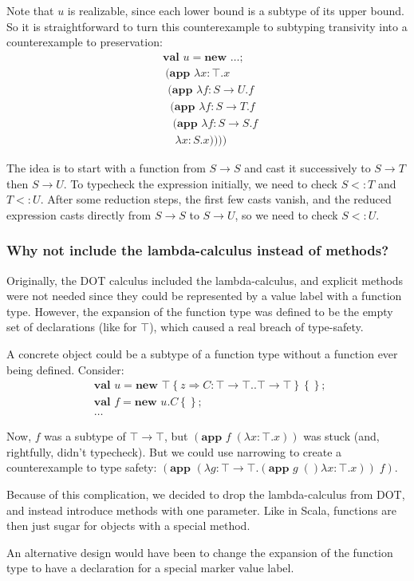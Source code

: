 \documentclass[9pt]{sigplanconf}
\newcommand{\sub}{<:}
\newcommand{\tfun}{\rightarrow}
\newcommand{\refine}[2]{\left\{#1 \Rightarrow #2 \right\}}
\newcommand{\ldefs}[1]{\left\{#1\right\}}
\newcommand{\abs}[3]{\lambda #1\!:\!#2.#3}
\newcommand{\mlnew}[3]{\textbf{val }#1 = \textbf{new }#2 ;\;\\&#3}
\newcommand{\Ldecl}[3]{#1 : #2..#3}%
\newcommand{\Top}{\top}%
\newcommand{\app}[2]{(\textbf{app }#1\;#2)}
\newcommand{\mlapp}[2]{(\textbf{app }#1\;\\&#2)}
\begin{document}
Note that $u$ is realizable, since each lower bound is a subtype of
its upper bound. So it is straightforward to turn this counterexample
to subtyping transivity into a counterexample to preservation:
\begin{align*}
&\mlnew u \ldots {
\ \mlapp{\abs x \Top x}{
\ \ \mlapp{\abs f {S \tfun U} f}{
\ \ \ \mlapp{\abs f {S \tfun T} f}{
\ \ \ \ \mlapp{\abs f {S \tfun S} f}{
\ \ \  \ \ \abs x S x}}}}}
\end{align*}

The idea is to start with a function from $S \tfun S$ and cast it
successively to $S \tfun T$ then $S \tfun U$. To typecheck the
expression initially, we need to check $S \sub T$ and $T \sub
U$. After some reduction steps, the first few casts vanish, and the
reduced expression casts directly from $S \tfun S$ to $S \tfun U$, so
we need to check $S \sub U$.

\subsubsection{Why not include the lambda-calculus instead of methods?}

Originally, the DOT calculus included the lambda-calculus, and
explicit methods were not needed since they could be represented by a
value label with a function type. However, the expansion of the
function type was defined to be the empty set of declarations (like
for $\Top$), which caused a real breach of type-safety.

A concrete object could be a subtype of a function type without a
function ever being defined. Consider:
\begin{align*}
&\mlnew u {\Top \refine z {\Ldecl C {\Top \tfun \Top} {\Top \tfun \Top}} \ldefs{}} {
\mlnew f {u.C \ldefs{}} {
\ldots
}}
\end{align*}

Now, $f$ was a subtype of $\Top \tfun \Top$, but $\app f {(\abs x \Top
  x)}$ was stuck (and, rightfully, didn't typecheck). But we could use
narrowing to create a counterexample to type safety: $\app {(\abs g
  {\Top \tfun \Top} {\app g (\abs x \Top x)})} f$.

Because of this complication, we decided to drop the lambda-calculus
from DOT, and instead introduce methods with one parameter. Like in
Scala, functions are then just sugar for objects with a special
method.

An alternative design would have been to change the expansion of the
function type to have a declaration for a special marker value label.
\end{document}
